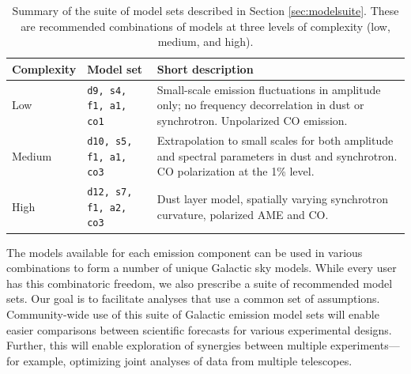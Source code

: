 \documentclass[twocolumn]{aastex631}
\begin{document}
\begin{table}
    \centering
    \begin{tabular}{p{} p{} p{}}
    
    \toprule 
    Complexity & Model set & Short description \\
    \midrule
    Low  & \texttt{d9, s4, f1, a1, co1} & Small-scale emission fluctuations in amplitude only; no frequency decorrelation in dust or synchrotron. Unpolarized CO emission.   \\
    Medium  & \texttt{d10, s5, f1, a1, co3} & Extrapolation to small scales for both amplitude and spectral parameters in dust and synchrotron. CO polarization at the 1\% level.  \\
    High  & \texttt{d12, s7, f1, a2, co3} & Dust layer model, spatially varying synchrotron curvature, polarized AME and CO.  \\
   
   \bottomrule
    \end{tabular}
    \caption{Summary of the suite of model sets described in Section \ref{sec:modelsuite}. These are recommended combinations of models at three levels of complexity (low, medium, and high).  }
    \label{tab:modelsuite}
\end{table}

The models available for each emission component can be used in various combinations to form a number of unique Galactic sky models. While every user has this combinatoric freedom, we also prescribe a suite of recommended model sets. Our goal is to facilitate analyses that use a common set of assumptions. Community-wide use of this suite of Galactic emission model sets will enable easier comparisons between scientific forecasts for various experimental designs. Further, this will enable exploration of synergies between multiple experiments---for example, optimizing joint analyses of data from multiple telescopes.


\end{document}

